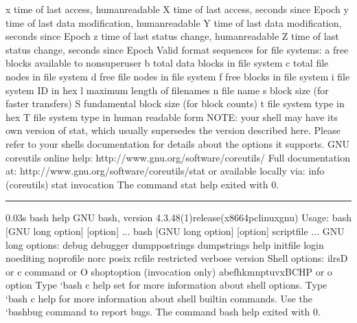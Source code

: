 \documentclass[letterpaper,12pt,english]{sphinxmanual}
\begin{document}
\begin{sphinxVerbatim}[commandchars=\\\{\}]
  \PYGZpc{}x   time of last access, human\PYGZhy{}readable
  \PYGZpc{}X   time of last access, seconds since Epoch
  \PYGZpc{}y   time of last data modification, human\PYGZhy{}readable
  \PYGZpc{}Y   time of last data modification, seconds since Epoch
  \PYGZpc{}z   time of last status change, human\PYGZhy{}readable
  \PYGZpc{}Z   time of last status change, seconds since Epoch
Valid format sequences for file systems:
  \PYGZpc{}a   free blocks available to non\PYGZhy{}superuser
  \PYGZpc{}b   total data blocks in file system
  \PYGZpc{}c   total file nodes in file system
  \PYGZpc{}d   free file nodes in file system
  \PYGZpc{}f   free blocks in file system
  \PYGZpc{}i   file system ID in hex
  \PYGZpc{}l   maximum length of filenames
  \PYGZpc{}n   file name
  \PYGZpc{}s   block size (for faster transfers)
  \PYGZpc{}S   fundamental block size (for block counts)
  \PYGZpc{}t   file system type in hex
  \PYGZpc{}T   file system type in human readable form
NOTE: your shell may have its own version of stat, which usually supersedes
the version described here.  Please refer to your shell\PYGZsq{}s documentation
for details about the options it supports.
GNU coreutils online help: \PYGZlt{}http://www.gnu.org/software/coreutils/\PYGZgt{}
Full documentation at: \PYGZlt{}http://www.gnu.org/software/coreutils/stat\PYGZgt{}
or available locally via: info \PYGZsq{}(coreutils) stat invocation\PYGZsq{}
The command \PYGZdq{}stat \PYGZhy{}\PYGZhy{}help\PYGZdq{} exited with 0.
\end{sphinxVerbatim}


\bigskip\hrule\bigskip


\begin{sphinxVerbatim}[commandchars=\\\{\}]
0.03s\PYGZdl{} bash \PYGZhy{}\PYGZhy{}help
GNU bash, version 4.3.48(1)\PYGZhy{}release\PYGZhy{}(x86\PYGZus{}64\PYGZhy{}pc\PYGZhy{}linux\PYGZhy{}gnu)
Usage: bash [GNU long option] [option] ...
 bash [GNU long option] [option] script\PYGZhy{}file ...
GNU long options:
 \PYGZhy{}\PYGZhy{}debug
 \PYGZhy{}\PYGZhy{}debugger
 \PYGZhy{}\PYGZhy{}dump\PYGZhy{}po\PYGZhy{}strings
 \PYGZhy{}\PYGZhy{}dump\PYGZhy{}strings
 \PYGZhy{}\PYGZhy{}help
 \PYGZhy{}\PYGZhy{}init\PYGZhy{}file
 \PYGZhy{}\PYGZhy{}login
 \PYGZhy{}\PYGZhy{}noediting
 \PYGZhy{}\PYGZhy{}noprofile
 \PYGZhy{}\PYGZhy{}norc
 \PYGZhy{}\PYGZhy{}posix
 \PYGZhy{}\PYGZhy{}rcfile
 \PYGZhy{}\PYGZhy{}restricted
 \PYGZhy{}\PYGZhy{}verbose
 \PYGZhy{}\PYGZhy{}version
Shell options:
 \PYGZhy{}ilrsD or \PYGZhy{}c command or \PYGZhy{}O shopt\PYGZus{}option   (invocation only)
 \PYGZhy{}abefhkmnptuvxBCHP or \PYGZhy{}o option
Type {}`bash \PYGZhy{}c \PYGZdq{}help set\PYGZdq{}\PYGZsq{} for more information about shell options.
Type {}`bash \PYGZhy{}c help\PYGZsq{} for more information about shell builtin commands.
Use the {}`bashbug\PYGZsq{} command to report bugs.
The command \PYGZdq{}bash \PYGZhy{}\PYGZhy{}help\PYGZdq{} exited with 0.
\end{sphinxVerbatim}
\end{document}
